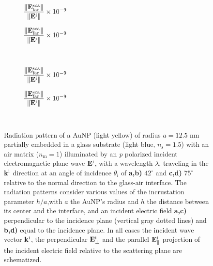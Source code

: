 \begin{figure}[b!]
    \centering
    \def\svgwidth{.8\textwidth}
    \\[-16.7em]
    \hspace*{-.2\textwidth}%
        \begin{subfigure}{.4\textwidth}\caption{%
                    \footnotesize$\dfrac{\norm{\vb{E}^\text{sca}_\text{far}}}{\norm{\vb{E}^\text{i}}} \times 10^{-9}$  }\label{sfig:Far:Inc:p2:a}\end{subfigure}%
        \begin{subfigure}{.4\textwidth}\caption{%
                    \footnotesize$\dfrac{\norm{\vb{E}^\text{sca}_\text{far}}}{\norm{\vb{E}^\text{i}}} \times 10^{-9}$  }\label{sfig:Far:Inc:p2:b}\end{subfigure}\\[13.75em]
    \def\svgwidth{.8\textwidth}
    \hspace*{-.21\textwidth}%
    \vspace*{-.7em}%
        \begin{subfigure}{.4\textwidth}\caption{%
                    \footnotesize$\dfrac{\norm{\vb{E}^\text{sca}_\text{far}}}{\norm{\vb{E}^\text{i}}} \times 10^{-9}$  }\label{sfig:Far:Inc:p2:c}\end{subfigure}%
        \begin{subfigure}{.4\textwidth}\caption{%
                    \footnotesize$\dfrac{\norm{\vb{E}^\text{sca}_\text{far}}}{\norm{\vb{E}^\text{i}}} \times 10^{-9}$  }\label{sfig:Far:Inc:p2:d}\end{subfigure}\\
    \caption[  Radiation pattern of a AuNP supported on a substrate illuminated at oblique incidence ]{
    Radiation pattern of a AuNP (light yellow) of radius $a = 12.5$ nm partially embedded in a glass substrate (light blue, $n_\text{s} = 1.5$) with an air matrix ($n_\text{m} = 1$) illuminated by an \textit{p} polarized incident electromagnetic plane wave $\vb{E}^\text{i}$, with a wavelength $\lambda$, traveling in the $\vb{k}^\text{i}$ direction at an angle of incidence $\theta_i$ of \textbf{a,b)} $42^\circ$ and \textbf{c,d)} $75^\circ$ relative to the normal direction to the glass-air interface. The radiation patterns consider various values of the incrustation parameter $h/a$,with $a$ the AuNP's radius and $h$ the distance between its center and the interface, and an  incident electric field \textbf{a,c)} perpendicular to the incidence plane (vertical gray dotted lines) and \textbf{b,d)} equal to the incidence plane. In all cases the incident wave vector $\vb{k}^\text{i}$, the perpendicular $\vb{E}_\perp^\text{i}$ and the  parallel $\vb{E}_\parallel^\text{i}$ projection of the incident electric field relative to the scattering plane are schematized.%
    }
    \label{fig:Far:Inc:p2}
\end{figure}


